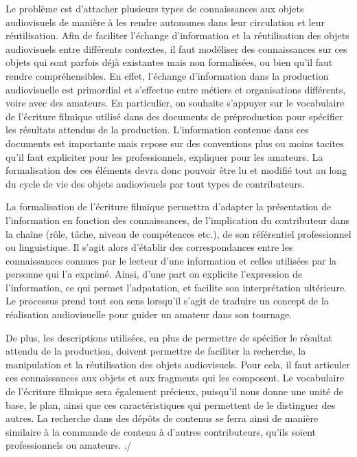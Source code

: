  Le problème est d'attacher plusieurs types de connaissances aux objets audiovisuels de manière à les rendre autonomes dans leur circulation et leur réutilisation. 
Afin de faciliter l'échange d'information et la réutilisation des objets audiovisuels entre différents contextes, il faut modéliser des connaissances sur ces objets qui sont parfois déjà existantes mais non formalisées, ou bien qu'il faut rendre compréhensibles.
En effet, l'échange d'information dans la production audiovisuelle est primordial et s'effectue entre métiers et organisations différents, voire avec des amateurs. 
En particulier, on souhaite s'appuyer sur le vocabulaire de l'écriture filmique utilisé dans des documents de préproduction pour spécifier les résultats attendus de la production.
L'information contenue dans ces documents est importante mais repose sur des conventions plus ou moins tacites qu'il faut expliciter pour les professionnels, expliquer pour les amateurs.
La formalisation des ces éléments devra donc pouvoir être lu et modifié tout au long du cycle de vie des objets audiovisuels par tout types de contributeurs.

La formalisation de l'écriture filmique permettra d'adapter la présentation de l'information en fonction des connaissances, de l'implication du contributeur dans la chaîne (rôle, tâche, niveau de compétences etc.), de son référentiel professionnel ou linguistique. 
Il s'agit alors d'établir des correspondances entre les connaissances connues par le lecteur d'une information et celles utilisées par la personne qui l'a exprimé.
Ainsi, d'une part on explicite l'expression de l'information, ce qui permet l'adpatation, et facilite son interprétation ultérieure.
Le processus prend tout son sens lorsqu'il s'agit de traduire un concept de la réalisation audiovisuelle pour guider un amateur dans son tournage.


De plus, les descriptions utilisées, en plus de permettre de spécifier le résultat attendu de la production, doivent permettre de faciliter la recherche, la manipulation et la réutilisation des objets audiovisuels.
Pour cela, il faut articuler ces connaissances aux objets et aux fragments qui les composent. 
Le vocabulaire de l'écriture filmique sera également précieux, puisqu'il nous donne une unité de base, le plan, ainsi que ces caractéristiques qui permettent de le distinguer des autres. 
La recherche dans des dépôts de contenus se ferra ainsi de manière similaire à la commande de contenu à d'autres contributeurs, qu'ils soient professionnels ou amateurs.
./



